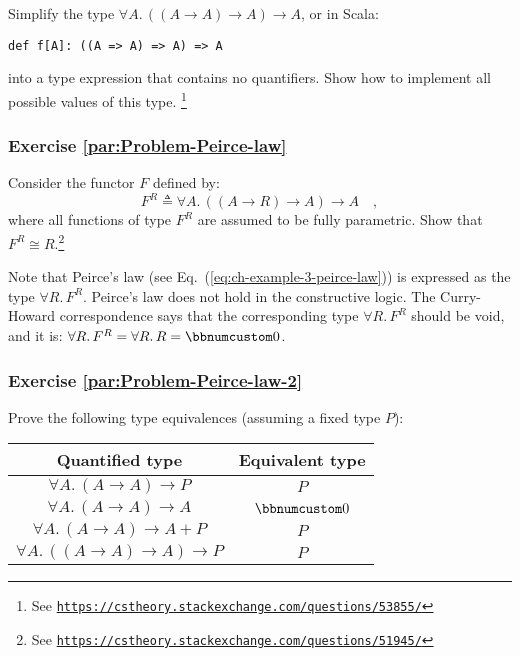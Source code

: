 Simplify the type $\forall A.\,((A\rightarrow A)\rightarrow A)\rightarrow A$,
or in Scala:
\begin{lstlisting}
def f[A]: ((A => A) => A) => A
\end{lstlisting}
into a type expression that contains no quantifiers. Show how to implement
all possible values of this type. \footnote{See \texttt{\href{https://cstheory.stackexchange.com/questions/53855/}{https://cstheory.stackexchange.com/questions/53855/}}}

\subsubsection{Exercise \label{par:Problem-Peirce-law}\ref{par:Problem-Peirce-law}}

Consider the functor $F$ defined by:
\[
F^{R}\triangleq\forall A.\,((A\rightarrow R)\rightarrow A)\rightarrow A\quad,
\]
where all functions of type $F^{R}$ are assumed to be fully parametric.
Show that $F^{R}\cong R$.\footnote{See \texttt{\href{https://cstheory.stackexchange.com/questions/51945/}{https://cstheory.stackexchange.com/questions/51945/}}}

Note that Peirce\textsf{'}s law (see Eq.~(\ref{eq:ch-example-3-peirce-law}))
is expressed as the type $\forall R.\,F^{R}$. Peirce\textsf{'}s law does not
hold in the constructive logic. The Curry-Howard correspondence says
that the corresponding type $\forall R.\,F^{R}$ should be void, and
it is: $\forall R.\,F^{R}=\forall R.\,R=\bbnum 0$. 

\subsubsection{Exercise \label{par:Problem-Peirce-law-2}\ref{par:Problem-Peirce-law-2}}

Prove the following type equivalences (assuming a fixed type $P$):

\begin{tabular}{|c|c|}
\hline 
\textbf{\footnotesize{}Quantified type} & \textbf{\footnotesize{}Equivalent type}\tabularnewline
\hline 
\hline 
$\forall A.\,(A\rightarrow A)\rightarrow P$ & $P$\tabularnewline
\hline 
$\forall A.\,(A\rightarrow A)\rightarrow A$ & $\bbnum 0$\tabularnewline
\hline 
$\forall A.\,(A\rightarrow A)\rightarrow A+P$ & $P$\tabularnewline
\hline 
$\forall A.\,((A\rightarrow A)\rightarrow A)\rightarrow P$ & $P$\tabularnewline
\hline 
\end{tabular}

